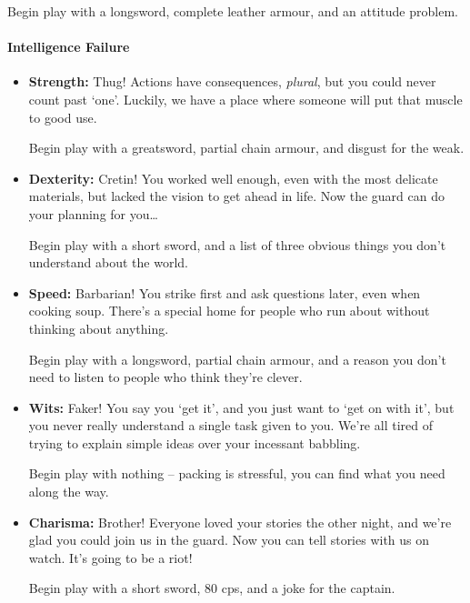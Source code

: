 \begin{multicols}{2}
\begin{itemize}
  Begin play with a longsword, complete leather armour, and an attitude problem.

\end{itemize}

\paragraph{Intelligence Failure}

\begin{itemize}

  \item
  \textbf{Strength:}
  Thug!
  Actions have consequences, \emph{plural}, but you could never count past `one'.
  Luckily, we have a place where someone will put that muscle to good use.

  Begin play with a greatsword, partial chain armour, and disgust for the weak.
  \item
  \textbf{Dexterity:}
  Cretin!
  You worked well enough, even with the most delicate materials, but lacked the vision to get ahead in life.
  Now the \gls{guard} can do your planning for you\ldots

  Begin play with a short sword, and a list of three obvious things you don't understand about the world.

  \item
  \textbf{Speed:}
  Barbarian!
  You strike first and ask questions later, even when cooking soup.
  There's a special home for people who run about without thinking about anything.

  Begin play with a longsword, partial chain armour, and a reason you don't need to listen to people who think they're clever.

  \item
  \textbf{Wits:}
  Faker!
  You say you `get it', and you just want to `get on with it', but you never really understand a single task given to you.
  We're all tired of trying to explain simple ideas over your incessant babbling.

  Begin play with nothing -- packing is stressful, you can find what you need along the way.
  \item
  \textbf{Charisma:}
  Brother!
  Everyone loved your stories the other night, and we're glad you could join us in the \gls{guard}.
  Now you can tell stories with us on watch.
  It's going to be a riot!

  Begin play with a short sword, 80 \glspl{cp}, and a joke for the captain.

\end{itemize}


\end{multicols}

